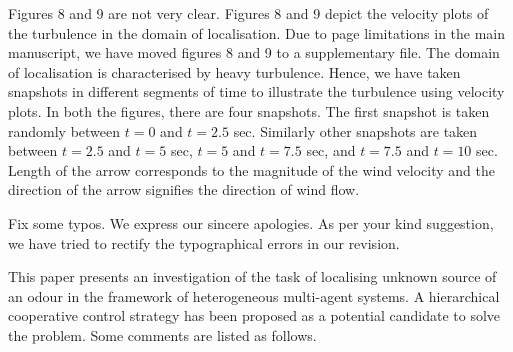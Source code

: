 \documentclass[10pt]{article}
\begin{document}
\begin{response}{Figures 8 and 9 are not very clear.}
Figures 8 and 9 depict the velocity plots of the turbulence in the domain of localisation. Due to page limitations in the main manuscript, we have moved figures 8 and 9 to a supplementary file. The domain of localisation is characterised by heavy turbulence. Hence, we have taken snapshots in different segments of time to illustrate the turbulence using velocity plots. In both the figures, there are four snapshots. The first snapshot is taken randomly between $t = 0$ and $t = 2.5$ sec. Similarly other snapshots are taken between $t = 2.5$ and $t = 5$ sec, $t = 5$ and $t = 7.5$ sec, and $t = 7.5$ and $t = 10$ sec. Length of the arrow corresponds to the magnitude of the wind velocity and the direction of the arrow signifies the direction of wind flow.

\end{response}

\begin{response}{Fix some typos.}
We express our sincere apologies. As per your kind suggestion, we have tried to rectify the typographical errors in our revision.

\end{response}

This paper presents an investigation of the task of localising unknown source of an odour in the framework of heterogeneous multi-agent systems. A hierarchical cooperative control strategy has been proposed as a potential candidate to solve the problem. Some comments are listed as follows.
\end{document}
